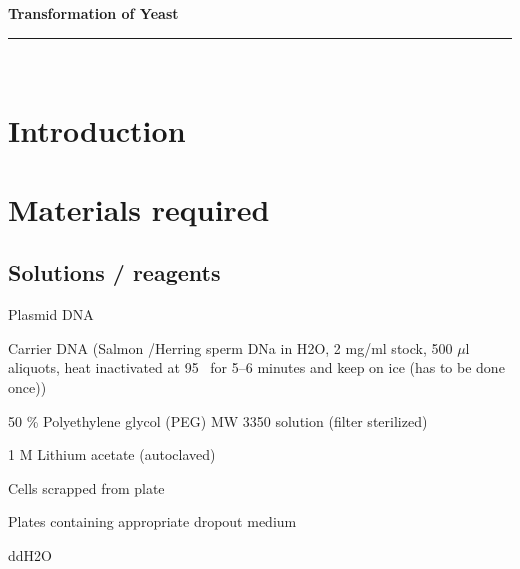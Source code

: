 \documentclass[a4paper,12pt]{article}
\newcommand{\protocol}{Transformation of Yeast}
\newcommand{\labtitle}{LAB TITLE}
\newcommand{\authorname}{YOURNAME}
\newenvironment{packed_enum}{
\begin{enumerate}
  \setlength{\itemsep}{1pt}
  \setlength{\parskip}{0pt}
  \setlength{\parsep}{0pt}
}{\end{enumerate}}
\begin{document}
 
 
 
\begin{titlepage}
\begin{center}
{\LARGE \textbf{\protocol} \\ \vspace{4pt}}
\rule[13pt]{\textwidth}{1pt} \\ \vspace{150pt}
\end{center}
 
\end{titlepage}
 
\newpage
\thispagestyle{empty}           %
\tableofcontents
\clearpage                      %
 
\setcounter{page}{1}
 
\section{Introduction}
\section {Materials required}
	\subsection{Solutions / reagents}
			\begin{packed_enum}
				\item Plasmid DNA
				\item Carrier DNA (Salmon /Herring sperm DNa in H{\scriptsize2}O, 2 mg/ml stock, 500 $\mu$l aliquots, heat inactivated at 95 \textcelsius\ for 5--6 minutes and keep on ice (has to be done once))
				\item 50 \% Polyethylene glycol (PEG) MW 3350 solution (filter sterilized)
				\item 1 M Lithium acetate (autoclaved)
				\item Cells scrapped from plate
				\item Plates containing appropriate dropout medium
				\item ddH{\scriptsize2}O
					\end{packed_enum}
\end{document}
